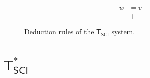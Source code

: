 \documentclass{article}
\theoremstyle{definition}
\theoremstyle{definition}
\theoremstyle{definition}
\theoremstyle{definition}
\theoremstyle{definition}
\newcommand{\TSCI}{$\mathsf{T_{SCI}}$\xspace}
\newcommand{\TsSCI}{$\mathsf{T^*_{SCI}}$\xspace}
\begin{document}
\begin{figure}[h]
\begin{subfigure}{\textwidth}
\begin{subfigure}{0.24\textwidth}
        \end{subfigure}
        \begin{subfigure}{0.24\textwidth}
            \begin{equation}
                \tag{$\bot_2$}
                \frac{
                    w^+ = v^-
                }%
                {\bot}
            \end{equation}
        \end{subfigure}
    \end{subfigure}
    \caption{Deduction rules of the \TSCI system.}
    \label{fig:rules1}
\end{figure}

\section{\TsSCI}
\end{document}
